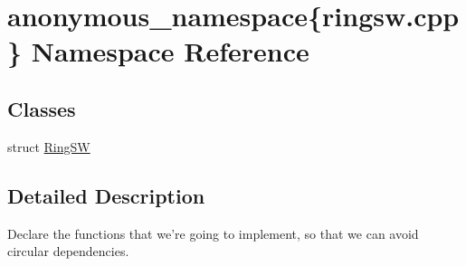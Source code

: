 \hypertarget{namespaceanonymous__namespace_02ringsw_8cpp_03}{\section{anonymous\-\_\-namespace\{ringsw.\-cpp\} Namespace Reference}
\label{namespaceanonymous__namespace_02ringsw_8cpp_03}
}
\subsection*{Classes}
\begin{DoxyCompactItemize}
\item 
struct \hyperlink{structanonymous__namespace_02ringsw_8cpp_03_1_1RingSW}{Ring\-S\-W}
\end{DoxyCompactItemize}


\subsection{Detailed Description}
Declare the functions that we're going to implement, so that we can avoid circular dependencies. 